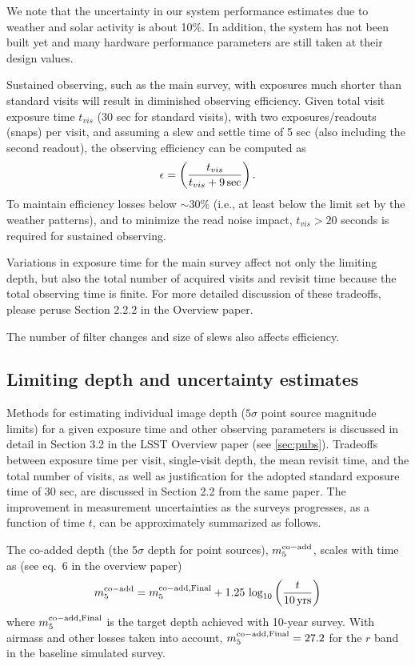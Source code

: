 \documentclass[DM,lsstdraft,toc,usenatbib]{lsstdoc}
\begin{document}
We note that the uncertainty in our system performance estimates due to weather and solar activity is about 10\%.
In addition, the system has not been built yet and many hardware performance parameters are
still taken at their design values.  

Sustained observing, such as the main survey, with exposures much shorter than standard visits will result
in diminished observing efficiency. Given total visit exposure time $t_{vis}$ (30 sec for standard
visits), with two exposures/readouts (snaps) per visit, and assuming a slew and settle time of 5 sec 
(also including the second readout), the observing efficiency can be computed as 
\begin{equation}
     \epsilon = \left( {t_{vis} \over t_{vis} + 9 \, \mathrm{sec}}\right).
\end{equation}
To maintain efficiency losses below $\sim$30\% (i.e., at least below the limit set by the weather patterns),
and to minimize the read noise impact, $t_{vis} > 20$ seconds is required for sustained observing. 

Variations in exposure time for the main survey affect not only the limiting depth, but also the total number of 
acquired visits and revisit time because the total observing time is finite. For more detailed 
discussion of these tradeoffs, please peruse Section 2.2.2 in the Overview paper. 

The number of filter changes and size of slews also affects efficiency. 

\subsection{Limiting depth and uncertainty estimates}  

Methods for estimating individual image depth ($5\sigma$ point source magnitude limits) for a given exposure time and other observing parameters
is discussed in detail in Section 3.2 in the LSST Overview paper (see \ref{sec:pubs}). Tradeoffs between 
exposure time per visit, single-visit depth, the mean revisit time, and the total number of visits,
as well as justification for the adopted standard exposure time of 30 sec, are discussed in Section 
2.2 from the same paper. The improvement in measurement uncertainties as the surveys progresses,
as a function of time $t$, can be approximately summarized as follows. 

The co-added depth (the 5$\sigma$ depth for point sources), $m_5^{\rm co-add}$, scales 
with time as (see eq.~6 in the overview paper)  
\begin{equation} 
         m_5^{\rm co-add}  = m_5^{\rm co-add, Final}  + 1.25 \, \log_{10}\left({t \over 10 \, {\rm yrs}}\right) 
\end{equation} 
where $m_5^{\rm co-add, Final}$ is the target depth achieved with 10-year survey. With
airmass and other losses taken into account, $m_5^{\rm co-add, Final}=27.2$ for the $r$ band
in the baseline simulated survey. 
\end{document}
